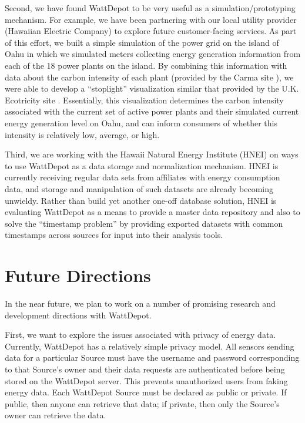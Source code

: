 \documentclass[conference]{IEEEtran}
\begin{document}
Second, we have found WattDepot to be very useful as a
simulation/prototyping mechanism.  For example, we have been partnering
with our local utility provider (Hawaiian Electric Company) to explore
future customer-facing services.  As part of this effort, we built a simple
simulation of the power grid on the island of Oahu in which we simulated
meters collecting energy
generation information from each of the 18 power plants on the island.  By
combining this information with data about the carbon intensity of each
plant (provided by the Carma site \cite{Carma}), we were able to develop a
``stoplight'' visualization similar that provided by the U.K. Ecotricity
site \cite{Ecotricity}.  Essentially, this visualization determines the
carbon intensity associated with the current set of active power plants and
their simulated current energy generation level on Oahu, and can inform
consumers of whether this intensity is relatively low, average, or high.

Third, we are working with the Hawaii Natural Energy Institute (HNEI) on
ways to use WattDepot as a data storage and normalization mechanism.  HNEI
is currently receiving regular data sets from affiliates with energy
consumption data, and storage and manipulation of such datasets are already
becoming unwieldy. Rather than build yet another one-off database solution,
HNEI is evaluating WattDepot as a means to provide a master data repository
and also to solve the ``timestamp problem'' by providing exported datasets
with common timestamps across sources for input into their analysis tools.

\section{Future Directions}

In the near future, we plan to work on a number of promising research and
development directions with WattDepot.

First, we want to explore the issues associated with privacy of energy
data.  Currently, WattDepot has a relatively simple privacy model.  All
sensors sending data for a particular Source must have the username and
password corresponding to that Source's owner and their data requests are
authenticated before being stored on the WattDepot server. This prevents
unauthorized users from faking energy data. Each WattDepot Source must be
declared as public or private.  If public, then anyone can retrieve that
data; if private, then only the Source's owner can retrieve the data.  
\end{document}
